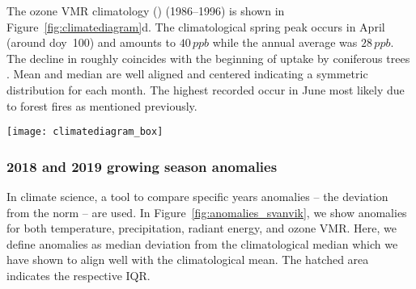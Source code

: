 \documentclass[bg, manuscript]{copernicus}
\begin{document}
The ozone VMR climatology () (1986--1996) is shown in Figure~\ref{fig:climatediagram}d. The climatological spring peak occurs in April (around \unit{doy}~100) and amounts to $40\,\unit{ppb}$ while the annual average  was $28\,\unit{ppb}$. The decline in  roughly coincides with the beginning of  uptake by coniferous trees \citep{TB:Kolari2007, TP:Wallin2013}. Mean and median are well aligned and centered indicating a symmetric distribution for each month. The highest recorded  occur in June most likely due to forest fires as mentioned previously.

\begin{figure*}[t]
  \texttt{[image: climatediagram\_box]}
  \caption{Climate diagram based on meteorological data for Svanvik/Pasvik (1992--2012). Ozone climatology based on ozone monitoring data (1986--1996). A box indicates the upper/lower quartile, whiskers the $1.5\times$ Interquartile Range (IQR), and circles outliers. The median is marked by a colored horizontal line and the mean by a triangle. Notches indicate the confidence interval around the median. (a) Temperature; (b) accumulated precipitation; (c) radiant energy; (d) ozone VMR}
  \label{fig:climatediagram}
\end{figure*}

\subsubsection{2018 and 2019 growing season anomalies}
\label{subsec:anomalies}

In climate science, a tool to compare specific years anomalies -- the deviation from the norm --  are used. In Figure~\ref{fig:anomalies_svanvik}, we show anomalies for both temperature, precipitation, radiant energy, and ozone VMR. Here, we define anomalies as median deviation from the climatological median which we have shown to align well with the climatological mean. The hatched area indicates the respective IQR.
\end{document}
